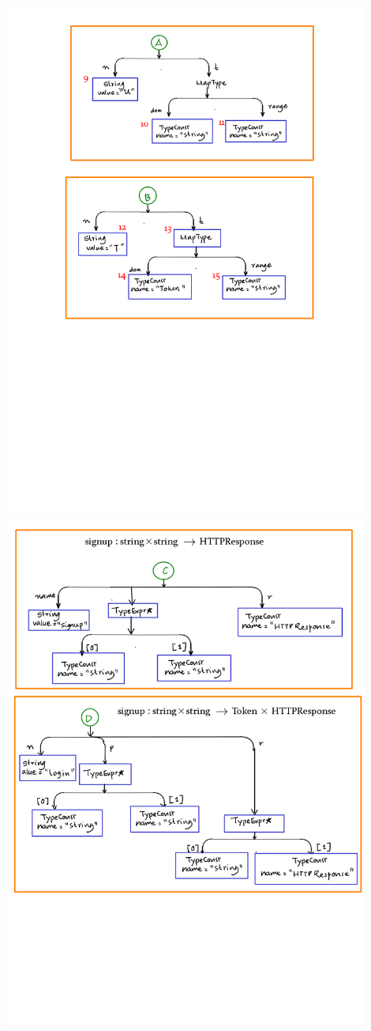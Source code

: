 \documentclass[12pts, a4paper]{article}
\begin{document}
\begin{center}
\includegraphics[width=0.9\textwidth]{../images/spec-AST-3.png}
\includegraphics[width=0.9\textwidth]{../images/spec-AST-4.png}

\end{center}
\end{document}
